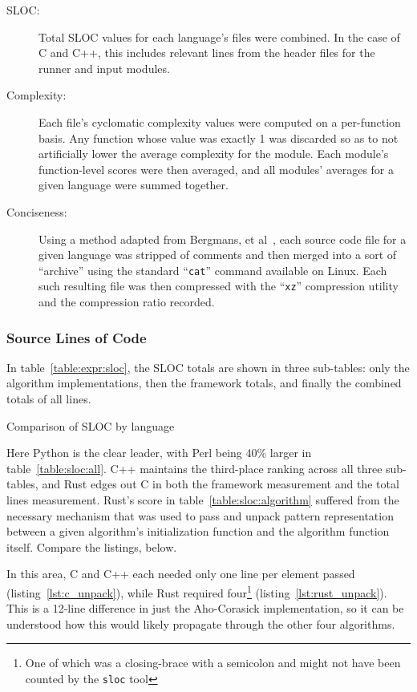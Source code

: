\begin{description}
\item[SLOC:] Total SLOC values for each language's files were combined. In the case of C and C++, this includes relevant lines from the header files for the runner and input modules.
\item[Complexity:] Each file's cyclomatic complexity values were computed on a per-function basis. Any function whose value was exactly 1 was discarded so as to not artificially lower the average complexity for the module. Each module's function-level scores were then averaged, and all modules' averages for a given language were summed together.
\item[Conciseness:] Using a method adapted from Bergmans, et al~\cite{bergmans}, each source code file for a given language was stripped of comments and then merged into a sort of ``archive'' using the standard ``\texttt{cat}'' command available on Linux. Each such resulting file was then compressed with the ``\texttt{xz}'' compression utility and the compression ratio recorded.
\end{description}

\subsubsection{Source Lines of Code}

In table~\ref{table:expr:sloc}, the SLOC totals are shown in three sub-tables: only the algorithm implementations, then the framework totals, and finally the combined totals of all lines.

\begin{table}[!htb]

\caption{Comparison of SLOC by language}
\label{table:expr:sloc}
\end{table}

Here Python is the clear leader, with Perl being 40\% larger in table~\ref{table:sloc:all}. C++ maintains the third-place ranking across all three sub-tables, and Rust edges out C in both the framework measurement and the total lines measurement. Rust's score in table~\ref{table:sloc:algorithm} suffered from the necessary mechanism that was used to pass and unpack pattern representation between a given algorithm's initialization function and the algorithm function itself. Compare the listings, below.





In this area, C and C++ each needed only one line per element passed (listing~\ref{lst:c_unpack}), while Rust required four\footnote{One of which was a closing-brace with a semicolon and might not have been counted by the \texttt{sloc} tool} (listing~\ref{lst:rust_unpack}). This is a 12-line difference in just the Aho-Corasick implementation, so it can be understood how this would likely propagate through the other four algorithms.


